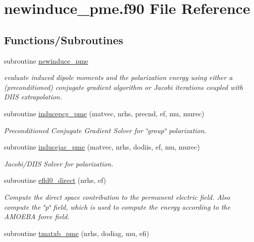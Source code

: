 \hypertarget{newinduce__pme_8f90}{\section{newinduce\-\_\-pme.\-f90 File Reference}
\label{newinduce__pme_8f90}
}
\subsection*{Functions/\-Subroutines}
\begin{DoxyCompactItemize}
\item 
subroutine \hyperlink{newinduce__pme_8f90_a0d93814010a7e9b25d82ea5c274a62e0}{newinduce\-\_\-pme}
\begin{DoxyCompactList}\small\item\em evaluate induced dipole moments and the polarization energy using either a (preconditioned) conjugate gradient algorithm or Jacobi iterations coupled with D\-I\-I\-S extrapolation. \end{DoxyCompactList}\item 
subroutine \hyperlink{newinduce__pme_8f90_a0f89235a4790585db560535c1ee812cc}{inducepcg\-\_\-pme} (matvec, nrhs, precnd, ef, mu, murec)
\begin{DoxyCompactList}\small\item\em Preconditioned Conjugate Gradient Solver for \char`\"{}group\char`\"{} polarization. \end{DoxyCompactList}\item 
subroutine \hyperlink{newinduce__pme_8f90_a675d786b69d807fbcf8e02f75f2762ca}{inducejac\-\_\-pme} (matvec, nrhs, dodiis, ef, mu, murec)
\begin{DoxyCompactList}\small\item\em Jacobi/\-D\-I\-I\-S Solver for polarization. \end{DoxyCompactList}\item 
subroutine \hyperlink{newinduce__pme_8f90_addbd31b05c25931afaca7a556c13ec79}{efld0\-\_\-direct} (nrhs, ef)
\begin{DoxyCompactList}\small\item\em Compute the direct space contribution to the permanent electric field. Also compute the \char`\"{}p\char`\"{} field, which is used to compute the energy according to the A\-M\-O\-E\-B\-A force field. \end{DoxyCompactList}\item 
subroutine \hyperlink{newinduce__pme_8f90_aef7c31d8ed9e8c7faf9036240c7a1bfd}{tmatxb\-\_\-pme} (nrhs, dodiag, mu, efi)

\end{DoxyCompactItemize}
